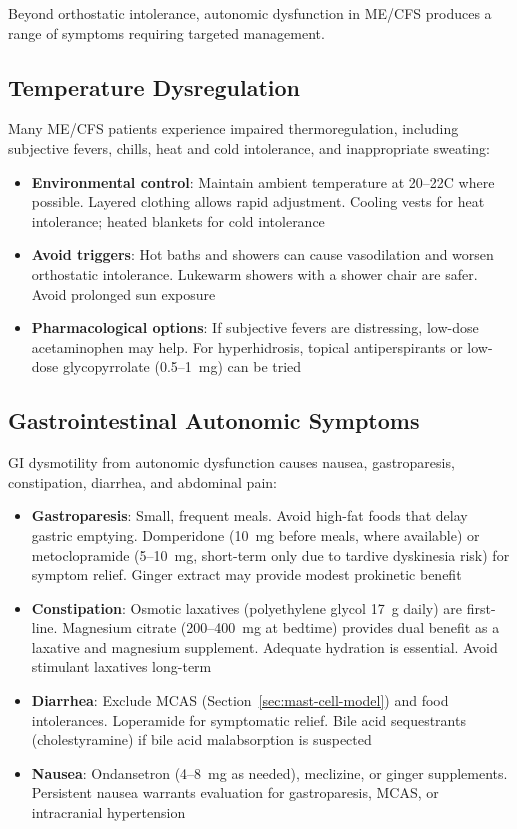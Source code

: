 Beyond orthostatic intolerance, autonomic dysfunction in ME/CFS produces a range of symptoms requiring targeted management.

\subsection{Temperature Dysregulation}

Many ME/CFS patients experience impaired thermoregulation, including subjective fevers, chills, heat and cold intolerance, and inappropriate sweating:

\begin{itemize}
    \item \textbf{Environmental control}: Maintain ambient temperature at 20--22\textdegree C where possible. Layered clothing allows rapid adjustment. Cooling vests for heat intolerance; heated blankets for cold intolerance
    \item \textbf{Avoid triggers}: Hot baths and showers can cause vasodilation and worsen orthostatic intolerance. Lukewarm showers with a shower chair are safer. Avoid prolonged sun exposure
    \item \textbf{Pharmacological options}: If subjective fevers are distressing, low-dose acetaminophen may help. For hyperhidrosis, topical antiperspirants or low-dose glycopyrrolate (0.5--1~mg) can be tried
\end{itemize}

\subsection{Gastrointestinal Autonomic Symptoms}

GI dysmotility from autonomic dysfunction causes nausea, gastroparesis, constipation, diarrhea, and abdominal pain:

\begin{itemize}
    \item \textbf{Gastroparesis}: Small, frequent meals. Avoid high-fat foods that delay gastric emptying. Domperidone (10~mg before meals, where available) or metoclopramide (5--10~mg, short-term only due to tardive dyskinesia risk) for symptom relief. Ginger extract may provide modest prokinetic benefit
    \item \textbf{Constipation}: Osmotic laxatives (polyethylene glycol 17~g daily) are first-line. Magnesium citrate (200--400~mg at bedtime) provides dual benefit as a laxative and magnesium supplement. Adequate hydration is essential. Avoid stimulant laxatives long-term
    \item \textbf{Diarrhea}: Exclude MCAS (Section~\ref{sec:mast-cell-model}) and food intolerances. Loperamide for symptomatic relief. Bile acid sequestrants (cholestyramine) if bile acid malabsorption is suspected
    \item \textbf{Nausea}: Ondansetron (4--8~mg as needed), meclizine, or ginger supplements. Persistent nausea warrants evaluation for gastroparesis, MCAS, or intracranial hypertension
\end{itemize}

